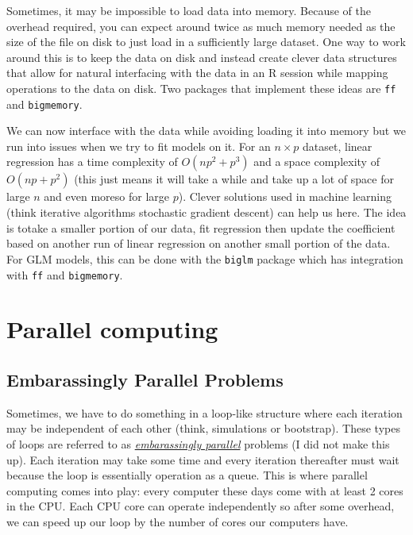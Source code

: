 \documentclass[]{book}
\begin{document}
Sometimes, it may be impossible to load data into memory. Because of the overhead required, you can expect around twice as much memory needed as the size of the file on disk to just load in a sufficiently large dataset. One way to work around this is to keep the data on disk and instead create clever data structures that allow for natural interfacing with the data in an R session while mapping operations to the data on disk. Two packages that implement these ideas are \texttt{ff} and \texttt{bigmemory}.

We can now interface with the data while avoiding loading it into memory but we run into issues when we try to fit models on it. For an \(n \times p\) dataset, linear regression has a time complexity of \(O(np^2 + p^3)\) and a space complexity of \(O(np + p^2)\) (this just means it will take a while and take up a lot of space for large \(n\) and even moreso for large \(p\)). Clever solutions used in machine learning (think iterative algorithms stochastic gradient descent) can help us here. The idea is totake a smaller portion of our data, fit regression then update the coefficient based on another run of linear regression on another small portion of the data. For GLM models, this can be done with the \texttt{biglm} package which has integration with \texttt{ff} and \texttt{bigmemory}.

\hypertarget{parallel-computing}{%
\section{Parallel computing}\label{parallel-computing}}

\hypertarget{embarassingly-parallel-problems}{%
\subsection{Embarassingly Parallel Problems}\label{embarassingly-parallel-problems}}

Sometimes, we have to do something in a loop-like structure where each iteration may be independent of each other (think, simulations or bootstrap). These types of loops are referred to as \href{https://www.google.com/search?client=safari\&rls=en\&q=embarassingly+parallel\&ie=UTF-8\&oe=UTF-8}{\emph{embarassingly parallel}} problems (I did not make this up). Each iteration may take some time and every iteration thereafter must wait because the loop is essentially operation as a queue. This is where parallel computing comes into play: every computer these days come with at least 2 cores in the CPU. Each CPU core can operate independently so after some overhead, we can speed up our loop by the number of cores our computers have.
\end{document}
